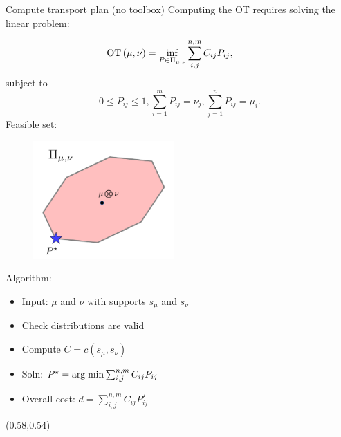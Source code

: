 \documentclass[pdf,aspectratio=169,10pt]{beamer}
\begin{document}
 

\begin{frame}{ Compute transport plan (no toolbox)}
    Computing the OT requires solving the linear problem:
\begin{minipage}{0.49\textwidth}  
\begin{equation*}
    \hspace{-2em}\OT{(\mu,\nu)} = \inf_{P\in\Pi_{\mu,\nu}}  \sum_{i,j}^{n,m} C_{ij}P_{ij}, 
\end{equation*}
subject to
\begin{equation*}
    0\leq P_{ij} \leq 1, \sum_{i=1}^m P_{ij} = \nu_j,  \sum_{j=1}^n P_{ij} = \mu_i.
\end{equation*}
Feasible set:
\begin{figure}
            \includegraphics[width=0.48\textwidth]{../img/polytope1.pdf}\hspace{2em}

\end{figure}

\end{minipage}
\hfill
\begin{minipage}{0.49\textwidth}  
Algorithm:

\begin{itemize}
    \item Input: $\mu$ and $\nu$ with supports $s_\mu$ and $s_\nu$
    \item Check distributions are valid
    \item Compute $C = c(s_\mu,s_\nu)$
    \item Soln: $P^\star = \mathop{\rm arg \; min}\limits \sum_{i,j}^{n,m} C_{ij}P_{ij} $
    \item Overall cost: $d = \sum_{i,j}^{n,m} C_{ij}P^\star_{ij}$ 
\end{itemize}
\end{minipage}

\begin{textblock}{0.45} (0.58,0.54)
\small
{}
\end{textblock}
\end{frame}
\end{document}
